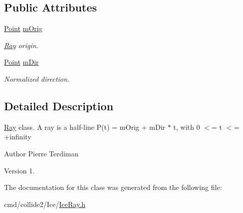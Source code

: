 \subsection*{Public Attributes}
\begin{DoxyCompactItemize}
\item 
\hyperlink{classPoint}{Point} \hyperlink{classRay_a9744c280ecde5650fd67a3c000444b28}{m\+Orig}\hypertarget{classRay_a9744c280ecde5650fd67a3c000444b28}{}\label{classRay_a9744c280ecde5650fd67a3c000444b28}

\begin{DoxyCompactList}\small\item\em \hyperlink{classRay}{Ray} origin. \end{DoxyCompactList}\item 
\hyperlink{classPoint}{Point} \hyperlink{classRay_aecb4e4aab5531c3f2e193c0f9293f5fc}{m\+Dir}\hypertarget{classRay_aecb4e4aab5531c3f2e193c0f9293f5fc}{}\label{classRay_aecb4e4aab5531c3f2e193c0f9293f5fc}

\begin{DoxyCompactList}\small\item\em Normalized direction. \end{DoxyCompactList}\end{DoxyCompactItemize}


\subsection{Detailed Description}
\hyperlink{classRay}{Ray} class. A ray is a half-\/line P(t) = m\+Orig + m\+Dir $\ast$ t, with 0 $<$= t $<$= +infinity

\begin{DoxyAuthor}{Author}
Pierre Terdiman 
\end{DoxyAuthor}
\begin{DoxyVersion}{Version}
1. 
\end{DoxyVersion}


The documentation for this class was generated from the following file\+:\begin{DoxyCompactItemize}
\item 
cmd/collide2/\+Ice/\hyperlink{IceRay_8h}{Ice\+Ray.\+h}\end{DoxyCompactItemize}

